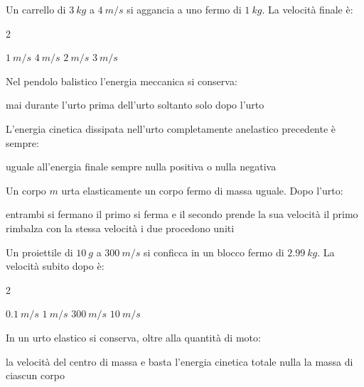 \documentclass[a4paper,10pt]{exam}
\newcommand{\um}[2]{\SI[output-decimal-marker={,}]{#1}{#2}}
\begin{document}
\vspace{2mm}
\begin{questions}
\question Un carrello di $\um{3}{kg}$ a $\um{4}{m/s}$ si aggancia a uno fermo di $\um{1}{kg}$. La velocità finale è:
\vspace{0.2em}
\begin{multicols}{2}
\begin{choices}
\choice $\um{1}{m/s}$
\choice $\um{4}{m/s}$
\choice $\um{2}{m/s}$
\choice $\um{3}{m/s}$
\end{choices}
\end{multicols}

\question Nel pendolo balistico l'energia meccanica si conserva:
\vspace{0.2em}
\begin{choices}
\choice mai
\choice durante l'urto
\choice prima dell'urto soltanto
\choice solo dopo l'urto
\end{choices}

\question L'energia cinetica dissipata nell'urto completamente anelastico precedente è sempre:
\vspace{0.2em}
\begin{choices}
\choice uguale all'energia finale
\choice sempre nulla
\choice positiva o nulla
\choice negativa
\end{choices}

\question Un corpo $m$ urta elasticamente un corpo fermo di massa uguale. Dopo l'urto:
\vspace{0.2em}
\begin{choices}
\choice entrambi si fermano
\choice il primo si ferma e il secondo prende la sua velocità
\choice il primo rimbalza con la stessa velocità
\choice i due procedono uniti
\end{choices}

\question Un proiettile di $\um{10}{g}$ a $\um{300}{m/s}$ si conficca in un blocco fermo di $\um{2.99}{kg}$. La velocità subito dopo è:
\vspace{0.2em}
\begin{multicols}{2}
\begin{choices}
\choice $\um{0.1}{m/s}$
\choice $\um{1}{m/s}$
\choice $\um{300}{m/s}$
\choice $\um{10}{m/s}$
\end{choices}
\end{multicols}

\question In un urto elastico si conserva, oltre alla quantità di moto:
\vspace{0.2em}
\begin{choices}
\choice la velocità del centro di massa e basta
\choice l'energia cinetica totale
\choice nulla
\choice la massa di ciascun corpo
\end{choices}


\end{questions}
\end{document}
